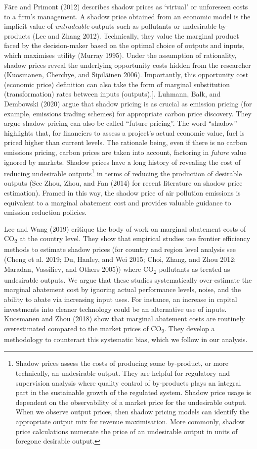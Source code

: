 \documentclass[
  10pt,
]{article}
\begin{document}
Färe and Primont (2012) describes shadow prices as `virtual' or
unforeseen costs to a firm's management. A shadow price obtained from an
economic model is the implicit value of \emph{untradeable} outputs such
as pollutants or undesirable by-products (Lee and Zhang 2012).
Technically, they value the marginal product faced by the decision-maker
based on the optimal choice of outputs and inputs, which maximises
utility (Murray 1995). Under the assumption of rationality, shadow
prices reveal the underlying opportunity costs hidden from the
researcher (Kuosmanen, Cherchye, and Sipiläinen 2006). Importantly, this
opportunity cost (economic price) definition can also take the form of
marginal substitution (transformation) rates between inputs
(outputs).{]}. Luhmann, Balk, and Dembowski (2020) argue that shadow
pricing is as crucial as emission pricing (for example, emissions
trading schemes) for appropriate carbon price discovery. They argue
shadow pricing can also be called ``future pricing''. The word
``shadow'' highlights that, for financiers to assess a project's actual
economic value, fuel is priced higher than current levels. The rationale
being, even if there is no carbon emissions pricing, carbon prices are
taken into account, factoring in \emph{future} value ignored by markets.
Shadow prices have a long history of revealing the cost of reducing
undesirable outputs\footnote{Shadow prices assess the costs of producing
  some by-product, or more technically, an undesirable output. They are
  helpful for regulatory and supervision analysis where quality control
  of by-products plays an integral part in the sustainable growth of the
  regulated system. Shadow price usage is dependent on the observability
  of a market price for the undesirable output. When we observe output
  prices, then shadow pricing models can identify the appropriate output
  mix for revenue maximisation. More commonly, shadow price calculations
  numerate the price of an undesirable output in units of foregone
  desirable output.} in terms of reducing the production of desirable
outputs (See Zhou, Zhou, and Fan (2014) for recent literature on shadow
price estimation). Framed in this way, the shadow price of air pollution
emissions is equivalent to a marginal abatement cost and provides
valuable guidance to emission reduction policies.

Lee and Wang (2019) critique the body of work on marginal abatement
costs of CO\textsubscript{2} at the country level. They show that
empirical studies use frontier efficiency methods to estimate shadow
prices (for country and region level analysis see (Cheng et al. 2019;
Du, Hanley, and Wei 2015; Choi, Zhang, and Zhou 2012; Maradan,
Vassiliev, and Others 2005)) where CO\textsubscript{2} pollutants as
treated as undesirable outputs. We argue that these studies
systematically over-estimate the marginal abatement cost by ignoring
actual performance levels, noise, and the ability to abate via
increasing input uses. For instance, an increase in capital investments
into cleaner technology could be an alternative use of inputs. Kuosmanen
and Zhou (2018) show that marginal abatement costs are routinely
overestimated compared to the market prices of CO\textsubscript{2}. They
develop a methodology to counteract this systematic bias, which we
follow in our analysis.
\end{document}
